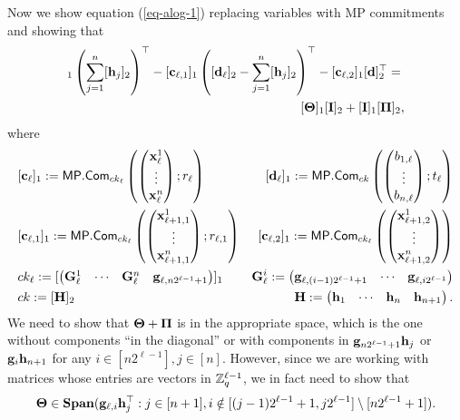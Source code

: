 Now we show equation (\ref{eq-alog-1}) replacing variables with MP commitments and showing that
\begin{align*}
[\vecb{c}_\ell]_1\left(\sum_{j=1}^n[\vecb{h}_j]_2\right)^\top-[\vecb{c}_{\ell,1}]_1\left([\vecb{d}_\ell]_2-\sum_{j=1}^n[\vecb{h}_j]_2\right)^\top-[\vecb{c}_{\ell,2}]_1[\vecb{d}]_2^\top
=&\\
[\matr{\Theta}]_1[\matr{I}]_2+[\matr{I}]_1[\matr{\Pi}]_2&,
\end{align*}
where
\begin{align*}
&[\mathbf{c}_\ell]_1:=\mathsf{MP}.\mathsf{Com}_{ck_\ell}\left(\left(\begin{matrix}\mathbf{x}^1_\ell\\\vdots\\\mathbf{x}^n_\ell\end{matrix}\right);r_\ell\right)
&[\mathbf{d}_\ell]_1:=\mathsf{MP}.\mathsf{Com}_{ck}\left(\left(\begin{matrix}b_{1,\ell}\\\vdots\\b_{n,\ell}\end{matrix}\right);t_\ell\right)\\
&[\mathbf{c}_{\ell,1}]_1:=\mathsf{MP}.\mathsf{Com}_{ck_\ell}\left(\left(\begin{matrix}\mathbf{x}^1_{\ell+1,1}\\\vdots\\\mathbf{x}^n_{\ell+1,1}\end{matrix}\right);r_{\ell,1}\right)
&[\mathbf{c}_{\ell,2}]_1:=\mathsf{MP}.\mathsf{Com}_{ck_\ell}\left(\left(\begin{matrix}\mathbf{x}^1_{\ell+1,2}\\\vdots\\\mathbf{x}^n_{\ell+1,2}\end{matrix}\right)\right)\\
&ck_\ell:=[\left(\begin{matrix}\mathbf{G}^1_{\ell}&\cdots&\mathbf{{G}}^n_{\ell} & \mathbf{g}_{\ell,n2^{\ell-1}+1}\end{matrix}\right)]_1
&\mathbf{{G}}^i_{\ell}:=\left(\begin{matrix}\mathbf{g}_{\ell,(i-1)2^{\ell-1}+1}&\cdots&\mathbf{g}_{\ell,i2^{\ell-1}}\end{matrix}\right)\\
&ck:=[\mathbf{{H}}]_2 &
\mathbf{{H}}:=\left(\begin{matrix}\mathbf{h}_1&\cdots&\mathbf{h}_n&\mathbf{h}_{n+1}\end{matrix}\right).
\end{align*}
We need to show that $\mathbf{{\Theta}}+\mathbf{{\Pi}}$ is in the appropriate space, which is the one without components ``in the diagonal'' or with components in $\mathbf{g}_{n2^{\ell-1}+1}\mathbf{h}_j$ or $\mathbf{g}_i\mathbf{h}_{n+1}$ for any $i\in[n2^{\ell-1}],j\in[n]$. However, since we are working with matrices whose entries are vectors in $\mathbb{Z}_q^{\ell-1}$, we in fact need to show that
$$
\mathbf{{\Theta}}\in\mathbf{Span}(\mathbf{g}_{\ell,i}\mathbf{h}_j^\top:j\in[n+1],i\notin[(j-1)2^{\ell-1}+1,j2^{\ell-1}]\setminus[n2^{\ell-1}+1]).
$$

